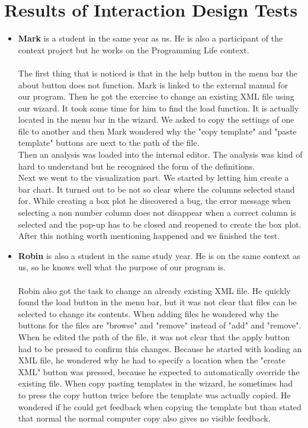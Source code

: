 \chapter{Results of Interaction Design Tests}
\begin{itemize}
\item \textbf{Mark} is a student in the same year as us. He is also a participant of the context project but he works on the Programming Life context.\\\\
The first thing that is noticed is that in the help button in the menu bar the about button does not function. Mark is linked to the external manual for our program. Then he got the exercise to change an existing XML file using our wizard. It took some time for him to find the load function. It is actually located in the menu bar in the wizard. We asked to copy the settings of one file to another and then Mark wondered why the "copy template" and "paste template" buttons are next to the path of the file.\\
Then an analysis was loaded into the internal editor. The analysis was kind of hard to understand but he recognised the form of the definitions.\\
Next we went to the visualization part. We started by letting him create a bar chart. It turned out to be not so clear where the columns selected stand for. While creating a box plot he discovered a bug, the error message when selecting a non number column does not disappear when a correct column is selected and the pop-up has to be closed and reopened to create the box plot. After this nothing worth mentioning happened and we finished the test.
\item \textbf{Robin} is also a student in the same study year. He is on the same context as us, so he knows well what the purpose of our program is.\\\\
Robin also got the task to change an already existing XML file. He quickly found the load button in the menu bar, but it was not clear that files can be selected to change its contents. When adding files he wondered why the buttons for the files are "browse" and "remove" instead of "add" and "remove". When he edited the path of the file, it was not clear that the apply button had to be pressed to confirm this changes. Because he started with loading an XML file, he wondered why he had to specify a location when the "create XML" button was pressed, because he expected to automatically override the existing file. When copy pasting templates in the wizard, he sometimes had to press the copy button twice before the template was actually copied. He wondered if he could get feedback when copying the template but than stated that normal the normal computer copy also gives no visible feedback.\\

\end{itemize}
